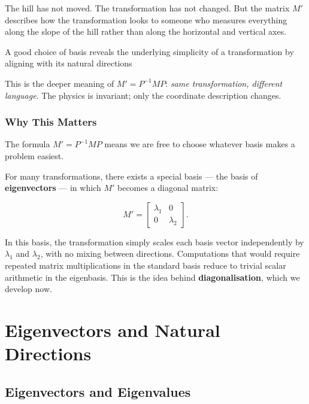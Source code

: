 \documentclass[11pt,openany]{book}
\theoremstyle{definition}
\begin{document}
\medskip

The hill has not moved. The transformation has not changed. But the matrix $M'$
describes how the transformation looks to someone who measures everything along the
slope of the hill rather than along the horizontal and vertical axes.

\medskip

\begin{keyidea} A good choice of basis reveals the underlying simplicity of a
transformation by aligning with its natural directions \end{keyidea}

\medskip

This is the deeper meaning of $M' = P^{-1}MP$: \textit{same transformation, different
language}. The physics is invariant; only the coordinate description changes.

\subsection{Why This Matters}

The formula $M' = P^{-1}MP$ means we are free to
choose whatever basis makes a problem easiest.

\medskip


For many transformations, there exists a special basis --- the basis of
\textbf{eigenvectors} --- in which $M'$ becomes a diagonal matrix:

\[
M' = \begin{bmatrix} \lambda_1 & 0 \\ 0 & \lambda_2 \end{bmatrix}.
\]

In this basis, the transformation simply scales each basis vector independently by
$\lambda_1$ and $\lambda_2$, with no mixing between directions. Computations that
would require repeated matrix multiplications in the standard basis reduce to
trivial scalar arithmetic in the eigenbasis. This is the idea behind
\textbf{diagonalisation}, which we develop now.

\chapter{Eigenvectors and Natural Directions}

\section{Eigenvectors and Eigenvalues}
\end{document}
